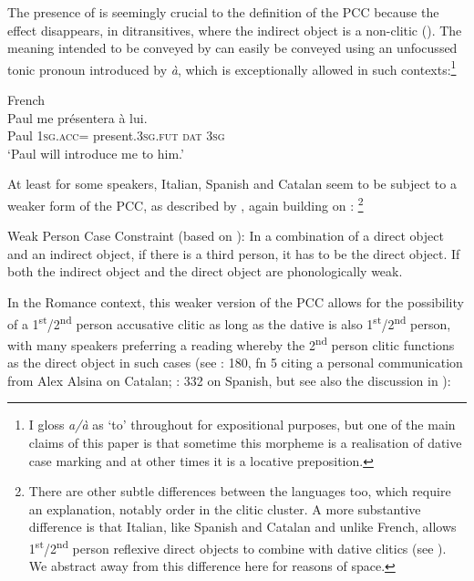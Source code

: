 \documentclass[output=paper,colorlinks,citecolor=brown,nonflat]{./langscibook}
\begin{document}
The presence of  is seemingly crucial to the definition of the PCC because the effect disappears, in ditransitives, where the indirect object is a non-clitic (\citealt{Kayne1975, Rezac2008}). The meaning intended to be conveyed by  can easily be conveyed using an unfocussed tonic pronoun introduced by \textit{à}, which is exceptionally allowed in such contexts:\footnote{I gloss \textit{a/à} as ‘to’ throughout for expositional purposes, but one of the main claims of this paper is that sometime this morpheme is a realisation of dative case marking and at other times it is a locative preposition.} 

\ea%
    \label{ex:sheehan:3}
    French \citep[174]{Kayne1975}\\
    \gll    Paul   me     présentera     à   lui.\\
            Paul  \textsc{1sg}.\textsc{acc}=  present.\textsc{3sg.fut}   \textsc{dat}   \textsc{3sg}\\
    \glt    ‘Paul will introduce me to him.’
\z

At least for some speakers, Italian, Spanish and Catalan seem to be subject to a weaker form of the PCC, as described by \citet{Bonet1991}, again building on \citet{Perlmutter1971}:\textstyleFootnoteSymbol{} \footnote{There are other subtle differences between the languages too, which require an explanation, notably order in the clitic cluster. A more substantive difference is that Italian, like Spanish and Catalan and unlike French, allows 1\textsuperscript{st}/2\textsuperscript{nd} person reflexive direct objects to combine with dative clitics (see \citealt{Kayne1975, Bianchi2006}). We abstract away from this difference here for reasons of space.}

\ea%
    \label{ex:sheehan:4}
    Weak Person Case Constraint (based on \citealt[181--182]{Bonet1991}):
    \ea\label{ex:sheehan:4a}
    In a combination of a direct object and an indirect object, if there is a third person, it has to be the direct object.
    \ex\label{ex:sheehan:4b}
    If both the indirect object and the direct object are phonologically weak.
    \z
\z

In the Romance context, this weaker version of the PCC allows for the possibility of a 1\textsuperscript{st}/2\textsuperscript{nd} person accusative clitic as long as the dative is also 1\textsuperscript{st}/2\textsuperscript{nd} person, with many speakers preferring a reading whereby the 2\textsuperscript{nd} person clitic functions as the direct object in such cases (see \citealt{Bonet1991}: 180, fn 5 citing a personal communication from Alex Alsina on Catalan; \citealt{OrmazabalRomero2010}: 332 on Spanish, but see also the discussion in \citealt{Bonet2007}):
\end{document}
